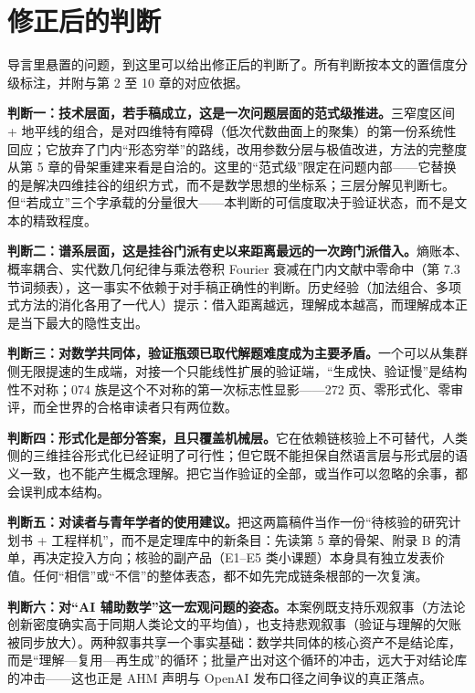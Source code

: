 \section{修正后的判断}

导言里悬置的问题，到这里可以给出修正后的判断了。所有判断按本文的置信度分级标注，并附与第 2 至 10 章的对应依据。

\textbf{判断一：技术层面，若手稿成立，这是一次问题层面的范式级推进。}\cfH{}三窄度区间 + 地平线的组合，是对四维特有障碍（低次代数曲面上的聚集）的第一份系统性回应；它放弃了门内“形态穷举”的路线，改用参数分层与极值改进，方法的完整度从第 5 章的骨架重建来看是自洽的。这里的“范式级”限定在问题内部——它替换的是解决四维挂谷的组织方式，而不是数学思想的坐标系；三层分解见判断七。但“若成立”三个字承载的分量很大——本判断的可信度取决于验证状态，而不是文本的精致程度。

\textbf{判断二：谱系层面，这是挂谷门派有史以来距离最远的一次跨门派借入。}\cfH{}熵账本、概率耦合、实代数几何纪律与乘法卷积 Fourier 衰减在门内文献中零命中（第 7.3 节词频表），这一事实不依赖于对手稿正确性的判断。历史经验（加法组合、多项式方法的消化各用了一代人）提示：借入距离越远，理解成本越高，而理解成本正是当下最大的隐性支出。

\textbf{判断三：对数学共同体，验证瓶颈已取代解题难度成为主要矛盾。}\cfH{}一个可以从集群侧无限提速的生成端，对接一个只能线性扩展的验证端，“生成快、验证慢”是结构性不对称；074 族是这个不对称的第一次标志性显影——272 页、零形式化、零审评，而全世界的合格审读者只有两位数。

\textbf{判断四：形式化是部分答案，且只覆盖机械层。}\cfM{}它在依赖链核验上不可替代，人类侧的三维挂谷形式化已经证明了可行性；但它既不能担保自然语言层与形式层的语义一致，也不能产生概念理解。把它当作验证的全部，或当作可以忽略的余事，都会误判成本结构。

\textbf{判断五：对读者与青年学者的使用建议。}\cfM{}把这两篇稿件当作一份“待核验的研究计划书 + 工程样机”，而不是定理库中的新条目：先读第 5 章的骨架、附录 B 的清单，再决定投入方向；核验的副产品（E1--E5 类小课题）本身具有独立发表价值。任何“相信”或“不信”的整体表态，都不如先完成链条根部的一次复演。

\textbf{判断六：对“AI 辅助数学”这一宏观问题的姿态。}\cfM{}本案例既支持乐观叙事（方法论创新密度确实高于同期人类论文的平均值），也支持悲观叙事（验证与理解的欠账被同步放大）。两种叙事共享一个事实基础：数学共同体的核心资产不是结论库，而是“理解—复用—再生成”的循环；批量产出对这个循环的冲击，远大于对结论库的冲击——这也正是 AHM 声明与 OpenAI 发布口径之间争议的真正落点。

